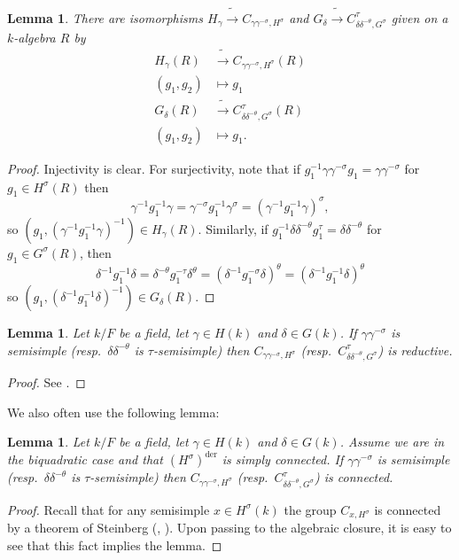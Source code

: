 \documentclass[12pt]{amsart}
\newtheorem{lem}[thm]{Lemma}
\theoremstyle{remark}
\numberwithin{equation}{section}
\newcommand{\lto}{\longrightarrow}
\theoremstyle{definition}
\numberwithin{equation}{subsection}
\begin{document}
\begin{lem} \label{lem-2cent} There are isomorphisms
$H_{\gamma} \tilde{\to} C_{\gamma\gamma^{-\sigma},H^{\sigma}}$ and
$G_{\delta} \tilde{\to}
C_{\delta\delta^{-\theta},G^{\sigma}}^{\tau}$
given on a $k$-algebra $R$ by
\begin{align} \label{2cent}
\nonumber H_{\gamma}(R) &\tilde{\lto} C_{\gamma\gamma^{-\sigma},H^{\sigma}}(R)\\
(g_1,g_2) &\longmapsto g_1\\
\nonumber G_{\delta}(R) & \tilde{\lto} C_{\delta
\delta^{-\theta},G^{\sigma}}^{\tau}(R)\\
\nonumber (g_1,g_2) &\longmapsto g_1.
\end{align}
\end{lem}
\begin{proof}
Injectivity is clear.  For surjectivity, note that if $g_1^{-1}\gamma \gamma^{-\sigma}g_1 =\gamma \gamma^{-\sigma}$ for $g_1 \in H^{\sigma}(R)$ then
$$
\gamma^{-1}g_1^{-1}\gamma=\gamma^{-\sigma} g_1^{-1}\gamma^{\sigma}=(\gamma^{-1}g_1^{-1}\gamma)^{\sigma},
$$
so $(g_1,(\gamma^{-1}g_1^{-1}\gamma)^{-1}) \in H_{\gamma}(R)$.  Similarly, if $g_1^{-1}\delta \delta^{-\theta}g_1^{\tau}=\delta \delta^{-\theta}$ for $g_1 \in G^{\sigma}(R)$, then
$$
\delta^{-1}g_1^{-1}\delta=\delta^{-\theta}g_1^{-\tau}\delta^{\theta}=(\delta^{-1} g_1^{-\sigma}\delta)^{\theta}=(\delta^{-1} g_1^{-1} \delta)^{\theta}
$$
so $(g_1,(\delta^{-1}g_1^{-1}\delta)^{-1}) \in G_{\delta}(R)$.
\end{proof}

\begin{lem} \label{lem-connect} Let $k/F$ be a field, let $\gamma \in H(k)$
and $\delta \in G(k)$.  If $\gamma\gamma^{-\sigma}$ is semisimple
(resp.~$\delta\delta^{-\theta}$ is  $\tau$-semisimple) then $C_{\gamma \gamma^{-\sigma},H^{\sigma}}$
(resp.~$C_{\delta \delta^{-\theta},G^{\sigma}}^{\tau}$) is reductive.
\end{lem}
\begin{proof} See \cite[\S 2]{Hahn}.
\end{proof}

We also often use the following lemma:

\begin{lem} \label{lem-biquad-cent} Let $k/F$ be a field, let $\gamma \in H(k)$ and $\delta \in G(k)$.  Assume we are in the biquadratic case and that $(H^{\sigma})^{\mathrm{der}}$ is simply connected.
If $\gamma \gamma^{-\sigma}$ is semisimple (resp.~$\delta\delta^{-\theta}$ is $\tau$-semisimple) then $C_{\gamma\gamma^{-\sigma},H^{\sigma}}$ (resp.~$C_{\delta\delta^{-\theta},G^{\sigma}}^{\tau}$) is connected.
\end{lem}
\begin{proof} Recall that for any semisimple $x \in H^{\sigma}(k)$ the group $C_{x,H^{\sigma}}$ is connected by a theorem of Steinberg (\cite{SteinbMem}, \cite[\S 3]{KottRatConj}).
Upon passing to the algebraic closure, it is easy to see that this fact implies the lemma.
\end{proof}
\end{document}
